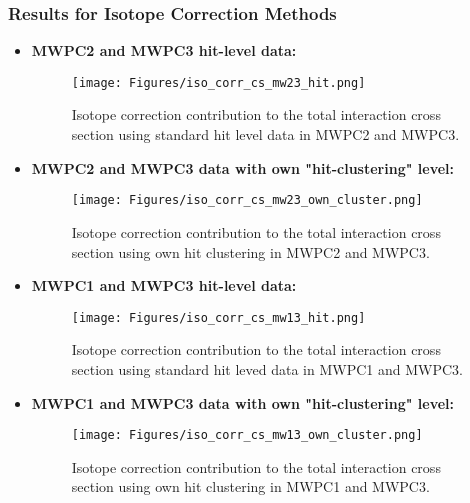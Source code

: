 \subsubsection{Results for Isotope Correction Methods}
\begin{itemize}
\item \textbf{MWPC2 and MWPC3 hit-level data:}\newline
\begin{figure}[h!]
    \centering
    \texttt{[image: Figures/iso\_corr\_cs\_mw23\_hit.png]}
    \caption{
	Isotope correction contribution to the total interaction cross section using standard hit level data in MWPC2 and MWPC3.
     }
    \label{fig:iso_corr_mw23_default}
\end{figure}

\item \textbf{MWPC2 and MWPC3 data with own "hit-clustering" level:}\newline 
\begin{figure}[h!]
    \centering
    \texttt{[image: Figures/iso\_corr\_cs\_mw23\_own\_cluster.png]}
    \caption{
	Isotope correction contribution to the total interaction cross section using own  hit clustering in MWPC2 and MWPC3.
     }
    \label{fig:iso_corr_mw23_own_cluster}
\end{figure}

\item \textbf{MWPC1 and MWPC3 hit-level data:}\newline
\begin{figure}[h!]
    \centering
    \texttt{[image: Figures/iso\_corr\_cs\_mw13\_hit.png]}
    \caption{
	Isotope correction contribution to the total interaction cross section using standard hit leved data  in MWPC1 and MWPC3.
     }
    \label{fig:iso_corr_mw13_default}
\end{figure}

\item \textbf{MWPC1 and MWPC3 data with own "hit-clustering" level:}\newline
\begin{figure}[h!]
    \centering
    \texttt{[image: Figures/iso\_corr\_cs\_mw13\_own\_cluster.png]}
    \caption{
	Isotope correction contribution to the total interaction cross section using own  hit clustering in MWPC1 and MWPC3.
     }
    \label{fig:iso_corr_mw13_own_cluster}
\end{figure}


\end{itemize}
